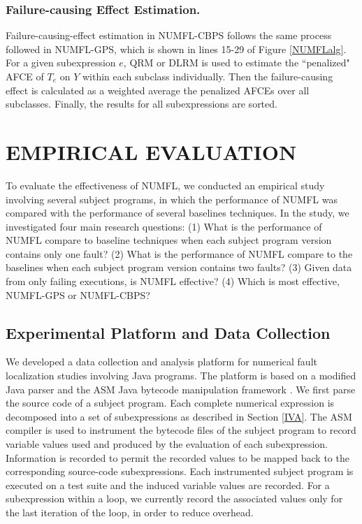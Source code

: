 \subsubsection{Failure-causing Effect Estimation.}
Failure-causing-effect estimation in NUMFL-CBPS follows the same process followed in NUMFL-GPS, which is shown in lines 15-29 of Figure \ref{NUMFLalg}.  For a given subexpression $e$, QRM or DLRM is used to estimate the ``penalized" AFCE of $T_e$ on $Y$ within each subclass individually. Then the failure-causing effect is calculated as a weighted average the penalized AFCEs over all subclasses. Finally, the results for all subexpressions are sorted.

\section{EMPIRICAL EVALUATION}\label{evaluation}
To evaluate the effectiveness of NUMFL, we conducted an empirical study involving several subject programs, in which the performance of NUMFL was compared with the performance of several baselines techniques. In the study, we investigated four main research questions:  (1) What is the performance of NUMFL compare to baseline techniques when each subject program version contains only one fault?  (2) What is the performance of NUMFL compare to the baselines when each subject program version contains two faults?   (3) Given data from only failing executions, is NUMFL effective?  (4) Which is most effective, NUMFL-GPS or NUMFL-CBPS?

\subsection{Experimental Platform and Data Collection}
We developed a data collection and analysis platform for numerical fault localization studies involving Java programs.  The platform is based on a modified Java parser \cite{Java} and the ASM Java bytecode manipulation framework \cite{ASM}.  We first parse the source code of a subject program.  Each complete numerical expression is decomposed into a set of subexpressions as described in Section \ref{IVA}.  The ASM compiler is used to instrument the bytecode files of the subject program to record variable values used and produced by the evaluation of each subexpression.  Information is recorded to permit the recorded values to be mapped back to the corresponding source-code subexpressions.  Each instrumented subject program is executed on a test suite and the induced variable values are recorded.  For a subexpression within a loop, we currently record the associated values only for the last iteration of the loop, in order to reduce overhead.

